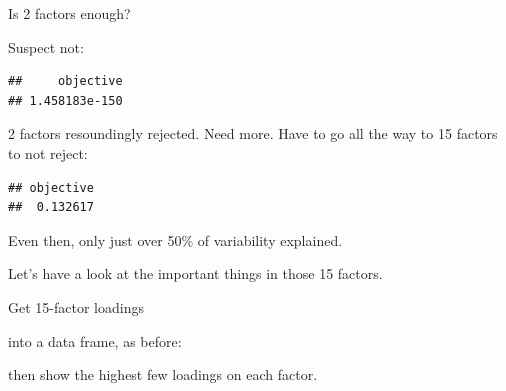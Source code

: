 \documentclass[ignorenonframetext,]{beamer}
\newenvironment{Shaded}{\begin{snugshade}}{\end{snugshade}}
\newcommand{\DataTypeTok}[1]{\textcolor[rgb]{0.13,0.29,0.53}{#1}}
\newcommand{\DecValTok}[1]{\textcolor[rgb]{0.00,0.00,0.81}{#1}}
\newcommand{\FloatTok}[1]{\textcolor[rgb]{0.00,0.00,0.81}{#1}}
\newcommand{\KeywordTok}[1]{\textcolor[rgb]{0.13,0.29,0.53}{\textbf{#1}}}
\newcommand{\NormalTok}[1]{#1}
\newcommand{\OperatorTok}[1]{\textcolor[rgb]{0.81,0.36,0.00}{\textbf{#1}}}
\newcommand{\StringTok}[1]{\textcolor[rgb]{0.31,0.60,0.02}{#1}}
\begin{document}
\begin{frame}[fragile]{Is 2 factors enough?}
\protect\hypertarget{is-2-factors-enough}{}

Suspect not:

\begin{Shaded}
\end{Shaded}

\begin{verbatim}
##     objective 
## 1.458183e-150
\end{verbatim}

2 factors resoundingly rejected. Need more. Have to go all the way to 15
factors to not reject:

\begin{Shaded}
\end{Shaded}

\begin{verbatim}
## objective 
##  0.132617
\end{verbatim}

Even then, only just over 50\% of variability explained.

Let's have a look at the important things in those 15 factors.

\end{frame}

\begin{frame}[fragile]{Get 15-factor loadings}
\protect\hypertarget{get-15-factor-loadings}{}

into a data frame, as before:

\small

\begin{Shaded}
\end{Shaded}

\normalsize

then show the highest few loadings on each factor.

\end{frame}
\end{document}
